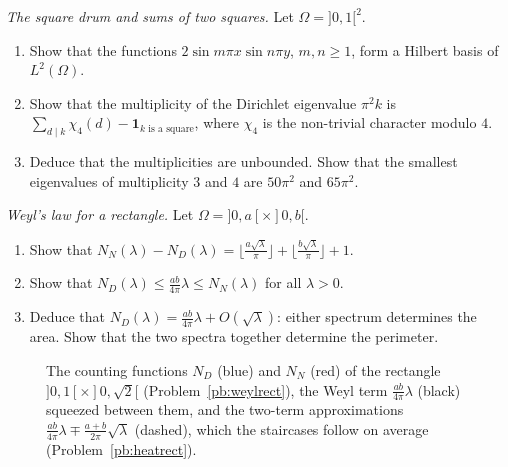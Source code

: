 \begin{exercise}[$\star$]\label{pb:squaredrum}
\emph{The square drum and sums of two squares.} Let $\Omega=]0,1[^2$.
\begin{enumerate}[label=(\alph*)]
\item Show that the functions $2\sin m\pi x\sin n\pi y$, $m,n\ge1$, form a Hilbert basis of $L^2(\Omega)$.
\item Show that the multiplicity of the Dirichlet eigenvalue $\pi^2k$ is $\sum_{d\mid k}\chi_4(d)-\mathbf 1_{k\text{ is a square}}$, where $\chi_4$ is the non-trivial character modulo $4$.
\item Deduce that the multiplicities are unbounded. Show that the smallest eigenvalues of multiplicity $3$ and $4$ are $50\pi^2$ and $65\pi^2$.
\end{enumerate}
\end{exercise}

\begin{exercise}[$\star\star$]\label{pb:weylrect}
\emph{Weyl's law for a rectangle.} Let $\Omega=]0,a[\times]0,b[$.
\begin{enumerate}[label=(\alph*)]
\item Show that $N_N(\lambda)-N_D(\lambda)=\bigl\lfloor\frac{a\sqrt\lambda}\pi\bigr\rfloor+\bigl\lfloor\frac{b\sqrt\lambda}\pi\bigr\rfloor+1$.
\item Show that $N_D(\lambda)\le\frac{ab}{4\pi}\lambda\le N_N(\lambda)$ for all $\lambda>0$.
\item Deduce that $N_D(\lambda)=\frac{ab}{4\pi}\lambda+O(\sqrt\lambda)$: either spectrum determines the area. Show that the two spectra together determine the perimeter.
\end{enumerate}
\end{exercise}

\begin{figure}[ht]
\centering
{}
\caption{The counting functions $N_D$ (blue) and $N_N$ (red) of the rectangle $]0,1[\times]0,\sqrt2[$ (Problem~\ref{pb:weylrect}), the Weyl term $\frac{ab}{4\pi}\lambda$ (black) squeezed between
them, and the two-term approximations $\frac{ab}{4\pi}\lambda\mp\frac{a+b}{2\pi}\sqrt\lambda$ (dashed), which the staircases follow on average (Problem~\ref{pb:heatrect}).}\label{fig:weyl}
\end{figure}

